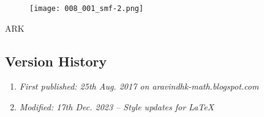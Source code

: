 \begin{figure}[H]
	\centering
	\texttt{[image: 008\_001\_smf-2.png]}
\end{figure}

ARK

\subsection{Version History}
\begin{enumerate}
	\item \emph{First published: 25th Aug. 2017 on aravindhk-math.blogspot.com}
	\item \emph{Modified: 17th Dec. 2023 -- Style updates for \LaTeX}
\end{enumerate}
